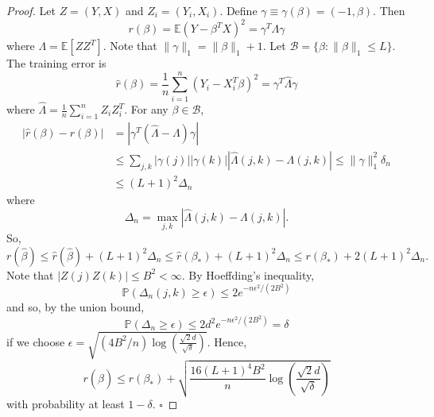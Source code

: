   \begin{proof}
    Let $Z = (Y, X)$ and $Z_i = (Y_i, X_i)$. Define $\gamma \equiv \gamma(\beta) = (-1, \beta)$. Then
    \begin{equation}
      r(\beta) = \mathbb{E}(Y - \beta^T X)^2 = \gamma^T \Lambda \gamma
    \end{equation}
    where $\Lambda = \mathbb{E}[ZZ^T]$. Note that $\|\gamma\|_1 = \|\beta\|_1 + 1$. Let $\mathcal{B} = \{\beta : \|\beta\|_1 \leq L\}$. The training error is
    \begin{equation}
      \hat{r}(\beta) = \frac{1}{n} \sum_{i=1}^n (Y_i - X_i^T \beta)^2 = \gamma^T \hat{\Lambda} \gamma
    \end{equation}
    where $\hat{\Lambda} = \frac{1}{n} \sum_{i=1}^n Z_i Z_i^T$. For any $\beta \in \mathcal{B}$,
    \begin{align}
      |\hat{r}(\beta) - r(\beta)| &= |\gamma^T (\hat{\Lambda} - \Lambda) \gamma| \\
      &\leq \sum_{j,k} |\gamma(j)| |\gamma(k)| |\hat{\Lambda}(j,k) - \Lambda(j,k)| \leq \|\gamma\|_1^2 \delta_n \\
      &\leq (L + 1)^2 \Delta_n
    \end{align}
    where
    \begin{equation}
      \Delta_n = \max_{j,k} |\hat{\Lambda}(j,k) - \Lambda(j,k)|.
    \end{equation}
    So,
    \begin{equation}
      r(\hat{\beta}) \leq \hat{r}(\hat{\beta}) + (L + 1)^2 \Delta_n \leq \hat{r}(\beta_*) + (L + 1)^2 \Delta_n \leq r(\beta_*) + 2(L + 1)^2 \Delta_n.
    \end{equation}
    Note that $|Z(j)Z(k)| \leq B^2 < \infty$. By Hoeffding's inequality,
    \begin{equation}
      \mathbb{P}(\Delta_n(j,k) \geq \epsilon) \leq 2e^{-n\epsilon^2/(2B^2)}
    \end{equation}
    and so, by the union bound,
    \begin{equation}
      \mathbb{P}(\Delta_n \geq \epsilon) \leq 2d^2 e^{-n\epsilon^2/(2B^2)} = \delta
    \end{equation}
    if we choose $\epsilon = \sqrt{(4B^2/n) \log \left( \frac{\sqrt{2}d}{\sqrt{\delta}} \right)}$. Hence,
    \begin{equation}
      r(\hat{\beta}) \leq r(\beta_*) + \sqrt{\frac{16(L + 1)^4 B^2}{n} \log \left( \frac{\sqrt{2}d}{\sqrt{\delta}} \right)}
    \end{equation}
    with probability at least $1 - \delta$. $\square$
  \end{proof}

